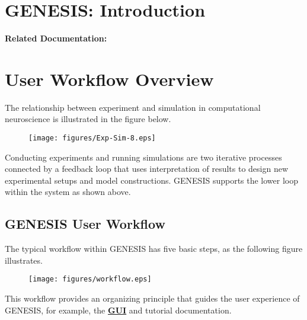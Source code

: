 \documentclass[12pt]{article}
\begin{document}
\section*{GENESIS: Introduction}

{\bf Related Documentation:}

\section*{User Workflow Overview}

The relationship between experiment and simulation in computational neuroscience is illustrated in the figure below.  

 \begin{figure}[h]
    \centering
    \texttt{[image: figures/Exp-Sim-8.eps]}
    \label{fig:df-1}
 \end{figure}

Conducting experiments and running simulations are two iterative processes connected by a feedback loop that uses interpretation of results to design new experimental setups and model constructions. GENESIS supports the lower loop within the system as shown above.

\subsection*{GENESIS User Workflow}

The typical workflow within GENESIS has five basic steps, as the following figure illustrates. 
 \begin{figure}[h]
    \centering
    \texttt{[image: figures/workflow.eps]}
    \label{fig:df-1}
 \end{figure}

This workflow provides an organizing principle that guides the user experience of GENESIS, for example, the \href{../gui/gui.tex}{\bf GUI} and tutorial documentation.
\end{document}
